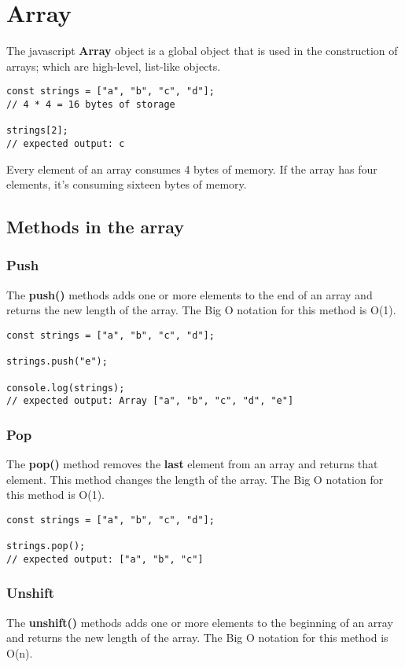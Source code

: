 \section{Array}
The javascript \textbf{Array} object is a global object that is used in the construction of arrays; which are high-level, list-like objects.
\begin{lstlisting}
const strings = ["a", "b", "c", "d"];
// 4 * 4 = 16 bytes of storage

strings[2]; 
// expected output: c
\end{lstlisting}
Every element of an array consumes 4 bytes of memory. If the array has four elements, it's consuming sixteen bytes of memory. 


\subsection{Methods in the array}

\subsubsection{Push}
The \textbf{push()} methods adds one or more elements to the end of an array and returns the new length of the array. The Big O notation for this method is O(1).
\begin{lstlisting}
const strings = ["a", "b", "c", "d"];

strings.push("e");

console.log(strings); 
// expected output: Array ["a", "b", "c", "d", "e"]
\end{lstlisting}


\subsubsection{Pop}
The \textbf{pop()} method removes the \textbf{last} element from an array and returns that element. This method changes the length of the array. The Big O notation for this method is O(1).

\begin{lstlisting}
const strings = ["a", "b", "c", "d"];

strings.pop();
// expected output: ["a", "b", "c"]
\end{lstlisting}

\subsubsection{Unshift}
The \textbf{unshift()} methods adds one or more elements to the beginning of an array and returns the new length of the array. The Big O notation for this method is O(n).

